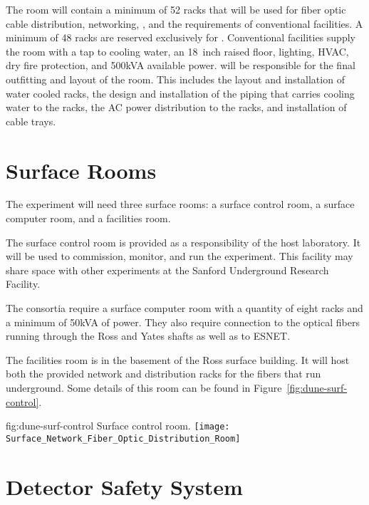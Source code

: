 The  room will contain a minimum of 52 racks that will be used for
fiber optic cable distribution, networking,  , and the
requirements of conventional facilities.  A minimum of 48 racks are
reserved exclusively for .  Conventional facilities supply the 
room with a tap to cooling water, an 18~inch raised floor, lighting,
HVAC, dry fire protection, and 500kVA available power.   will be responsible for the final outfitting and layout
of the room.  This includes the layout and installation of water
cooled racks, the design and installation of the piping that carries cooling water 
to the racks, the AC power distribution to the racks, and installation
of cable trays.


\section{Surface Rooms}
\label{sec:fdsp-coord-surf-rooms}


The  experiment will need three surface rooms: a surface
control room, a  surface computer room, and a facilities room.


The  surface control room is provided as a responsibility of the host laboratory.  It will be used to commission, monitor, and run the
experiment.  This facility may share space with
other experiments at the Sanford Underground Research
Facility.


The  consortia require a surface computer room with a
quantity of eight racks and a minimum of 50kVA of power.  They also require connection
to the optical fibers running through the Ross and Yates shafts as
well as to ESNET.


The facilities room is in the basement of the Ross surface
building.  It will host both the \fnal provided network and
distribution racks for the fibers that run underground. Some details
of this room can be found in Figure~\ref{fig:dune-surf-control}.
\begin{dunefigure}{fig:dune-surf-control}
  {Surface control room.}
  \texttt{[image: Surface\_Network\_Fiber\_Optic\_Distribution\_Room]}
\end{dunefigure}


\section{ Detector Safety System}
\label{sec:fdsp-coord-det-safety}


